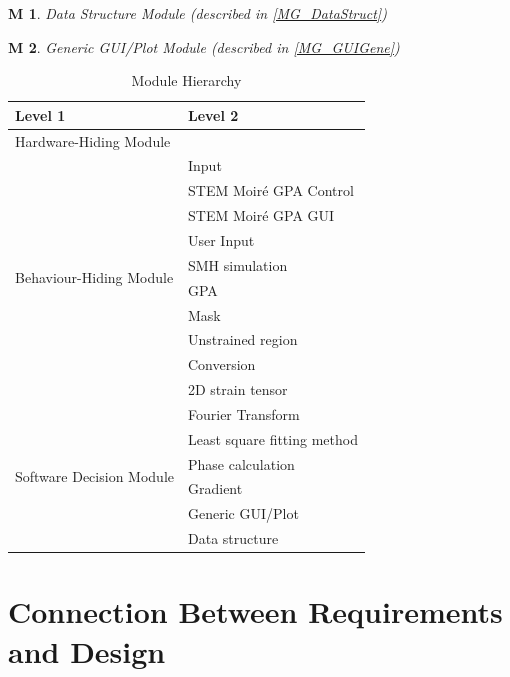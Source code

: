 \documentclass[12pt, titlepage]{article}
\newcommand{\progname}{STEM Moir{\'e} GPA}
\newtheorem{M}{M}
\begin{document}
\begin{M}\normalfont Data Structure Module (described in \cref{MG_DataStruct})
\label{M_DataStruct}
\end{M}

\begin{M}\normalfont Generic GUI/Plot Module (described in \cref{MG_GUIGene})
\label{M_GUIGene}
\end{M}

\begin{table}[H]
\centering
\begin{tabular}{p{} p{}}
\toprule
\textbf{Level 1} & \textbf{Level 2}\\
\midrule

{Hardware-Hiding Module} & ~ \\
\midrule

\multirow{10}{0.3\textwidth}{Behaviour-Hiding Module} & Input\\
& \progname{} Control \\
& \progname{} GUI \\
& User Input \\
& SMH simulation \\
& GPA \\
& Mask \\
& Unstrained region \\
& Conversion \\
& 2D strain tensor \\
\midrule

\multirow{7}{0.3\textwidth}{Software Decision Module} & Fourier Transform \\
& Least square fitting method \\
& Phase calculation \\
& Gradient \\
& Generic GUI/Plot \\
& Data structure \\
\bottomrule

\end{tabular}
\caption{Module Hierarchy}
\label{TblMH}
\end{table}

\section{Connection Between Requirements and Design} \label{SecConnection}
\end{document}
